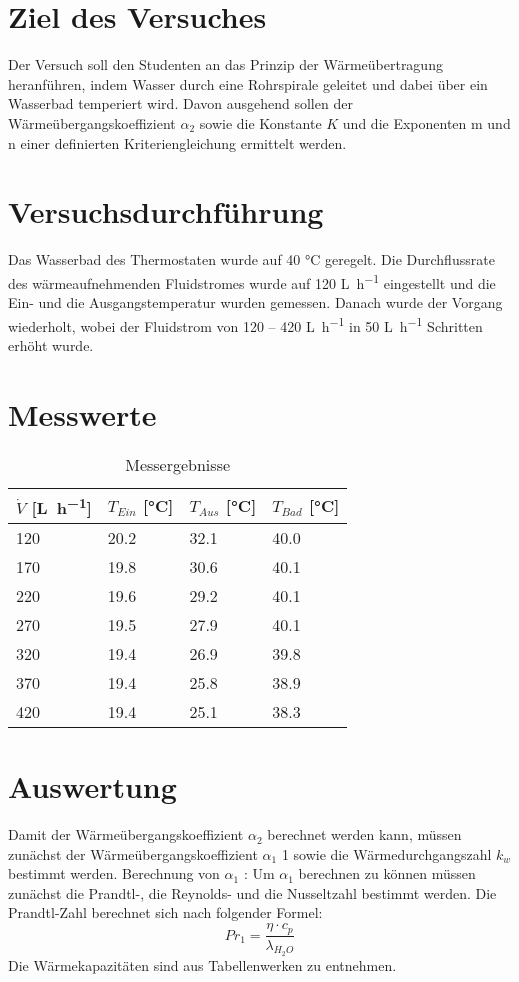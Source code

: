 \documentclass{article}
\begin{document}
%
%

\noindent
\section{Ziel des Versuches}
Der Versuch soll den Studenten an das Prinzip der Wärmeübertragung heranführen, indem
Wasser durch eine Rohrspirale geleitet und dabei über ein Wasserbad temperiert wird.
Davon ausgehend sollen der Wärmeübergangskoeffizient $\alpha _2$ sowie die Konstante $K$ und die
Exponenten m und n einer definierten Kriteriengleichung ermittelt werden.
\section{Versuchsdurchführung}
Das Wasserbad des Thermostaten wurde auf 40 \si{\celsius} geregelt. Die Durchflussrate des
wärmeaufnehmenden Fluidstromes wurde auf 120 \si{\liter\per\hour} eingestellt und die Ein- und die
Ausgangstemperatur wurden gemessen. Danach wurde der Vorgang wiederholt, wobei der
Fluidstrom von 120 – 420 \si{\liter\per\hour} in 50 \si{\liter\per\hour} Schritten erhöht wurde.
\section{Messwerte}
\begin{table}[ht!]
  \centering
 \begin{tabularx}{\textwidth}{XXXX}
$\dot V$ [\si{\liter\per\hour}] & $T_{Ein}$ [\si{\celsius}]  & $T_{Aus}$ [\si{\celsius}] & $T_{Bad}$ [\si{\celsius}]  \\
\hline
\rowcolor{LightCyan}
120  & 20.2 & 32.1 & 40.0\\
170  & 19.8 & 30.6 & 40.1\\
\rowcolor{LightCyan}
220 & 19.6 & 29.2 & 40.1\\
270 & 19.5 & 27.9 & 40.1\\
\rowcolor{LightCyan}
320 & 19.4 & 26.9 & 39.8\\
370 & 19.4 & 25.8 & 38.9\\
\rowcolor{LightCyan}
420 & 19.4 & 25.1 & 38.3\\
\end{tabularx}
  \caption{Messergebnisse}
\end{table}
\section{Auswertung}
Damit der Wärmeübergangskoeffizient $\alpha _2$  berechnet werden kann, müssen zunächst der
Wärmeübergangskoeffizient $\alpha _1$ 1 sowie die Wärmedurchgangszahl $k _w$ bestimmt werden.
Berechnung von $\alpha _1$ :
Um $\alpha _1$  berechnen zu können müssen zunächst die Prandtl-, die Reynolds- und die
Nusseltzahl bestimmt werden.
Die Prandtl-Zahl berechnet sich nach folgender Formel:
\begin{equation}
  Pr_1 = \frac{\eta \cdot c _p}{\lambda _{H_2O}}
\end{equation}
Die Wärmekapazitäten sind aus Tabellenwerken zu entnehmen.
\end{document}
